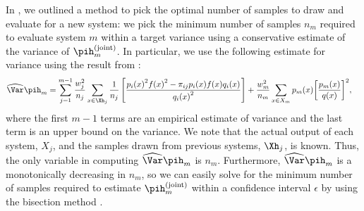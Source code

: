 In , we outlined a method to pick the optimal number of samples to draw and evaluate for a new system:
  we pick the minimum number of samples $n_m$ required to evaluate system $m$ within a target variance using a conservative estimate of the variance of $\pih_m^{\text{(joint)}}$.
  In particular, we use the following estimate for variance using the result from :
\begin{align*} 
  \widehat{\Var}{\pih_m} &= \sum_{j=1}^{m-1} \frac{w_j^2}{n_j} \sum_{x \in \Xh_j} \frac{1}{n_j} \left[\frac{{p_i(x)}^2{f(x)}^2 - \pi_{ij}p_i(x)f(x)q_i(x)}{{q_i(x)}^2} \right] + \frac{w_m^2}{n_m} \sum_{x \in X_m} p_m(x) {\left[ \frac{p_m(x)}{q(x)} \right]}^2,
\end{align*} 
where the first $m-1$ terms are an empirical estimate of variance and the last term is an upper bound on the variance.
We note that the actual output of each system, $X_j$, and the samples drawn from previous systems, $\Xh_{j}$, is known.
Thus, the only variable in computing $\widehat{\Var}{\pih_m}$ is $n_m$.
Furthermore, $\widehat{\Var}{\pih_m}$ is a monotonically decreasing in $n_m$, so we can easily solve for the minimum number of samples required to estimate $\pih_m^{\text{(joint)}}$ within a confidence interval $\epsilon$ by using the bisection method \citep{burden1985bisection}.


